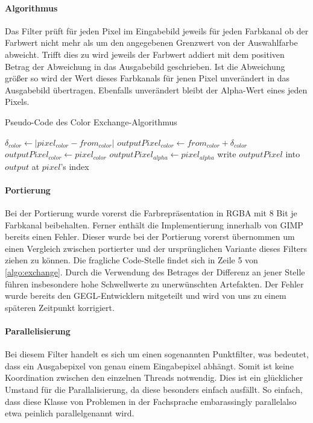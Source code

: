 \documentclass[10pt,a4paper]{article}
\providecommand{\abs}[1]{\lvert#1\rvert}
\begin{document}
\paragraph{Algorithmus} 

Das Filter prüft für jeden Pixel im Eingabebild jeweils für jeden Farbkanal ob der Farbwert nicht mehr als um den angegebenen Grenzwert von der Auswahlfarbe abweicht. Trifft dies zu wird jeweils der Farbwert addiert mit dem positiven Betrag der Abweichung in das Ausgabebild geschrieben. Ist die Abweichung größer so wird der Wert dieses Farbkanals für jenen Pixel unverändert in das Ausgabebild übertragen. Ebenfalls unverändert bleibt der Alpha-Wert eines jeden Pixels.

\begin{algorithm}[H]
\caption{Pseudo-Code des \glqq Color Exchange\grqq-Algorithmus}
\label{algo:exchange}
\begin{algorithmic}[1]
    \State $\delta_{color} \gets \abs{ pixel_{color} - from_{color}}$    
      \State $outputPixel_{color} \gets from_{color} + \delta_{color}$
    \Else
      \State $outputPixel_{color} \gets pixel_{color}$
    \EndIf
  \EndFor
  \State $outputPixel_{alpha} \gets pixel_{alpha}$
  \State write $outputPixel$ into $output$ at $pixel$'s index 
\EndFor
\end{algorithmic}
\end{algorithm}

\paragraph{Portierung}
Bei der Portierung wurde vorerst die Farbrepräsentation in RGBA mit 8 Bit je Farbkanal beibehalten. Ferner enthält die Implementierung innerhalb von GIMP bereits einen Fehler. Dieser wurde bei der Portierung vorerst übernommen um einen Vergleich zwischen portierter und der ursprünglichen Variante dieses Filters ziehen zu können. Die fragliche Code-Stelle findet sich in Zeile 5 von \autoref{algo:exchange}. Durch die Verwendung des Betrages der Differenz an jener Stelle führen insbesondere hohe Schwellwerte zu unerwünschten Artefakten. Der Fehler wurde bereits den GEGL-Entwicklern mitgeteilt und wird von uns zu einem späteren Zeitpunkt korrigiert.

\paragraph{Parallelisierung}
Bei diesem Filter handelt es sich um einen sogenannten Punktfilter, was bedeutet, dass ein Ausgabepixel von genau einem Eingabepixel abhängt. Somit ist keine Koordination zwischen den einzelnen Threads notwendig. Dies ist ein glücklicher Umstand für die Parallalisierung, da diese besonders einfach ausfällt. So einfach, dass diese Klasse von Problemen in der Fachsprache \glqq embarassingly parallel\grqq also etwa \glqq peinlich parallel\grqq genannt wird.
\end{document}
